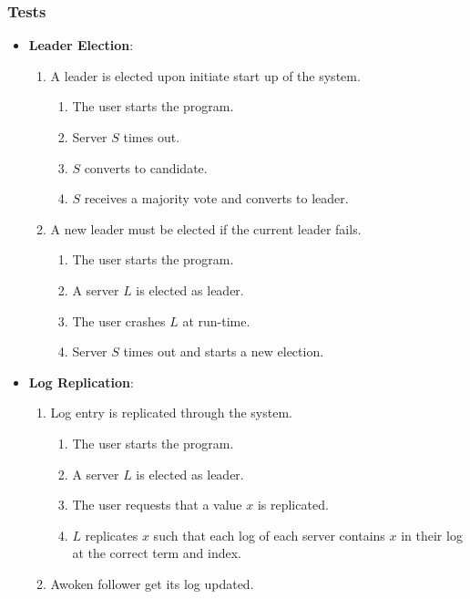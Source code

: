\subsubsection{Tests}

\begin{itemize}
\item \textbf{Leader Election}:
    \begin{enumerate}
    \item A leader is elected upon initiate start up of the system.
        \begin{enumerate}
        \item The user starts the program.
        \item Server $S$ times out.
        \item $S$ converts to candidate.
        \item $S$ receives a majority vote and converts to leader.
        \end{enumerate}
    \item A new leader must be elected if the current leader fails.
        \begin{enumerate}
        \item The user starts the program.
        \item A server $L$ is elected as leader.
        \item The user crashes $L$ at run-time.
        \item Server $S$ times out and starts a new election.
        \end{enumerate}
    \end{enumerate}
\item \textbf{Log Replication}:
    \begin{enumerate}
    \item Log entry is replicated through the system.
        \begin{enumerate}
        \item The user starts the program.
        \item A server $L$ is elected as leader.
        \item The user requests that a value $x$ is replicated.
        \item $L$ replicates $x$ such that each log of each server contains $x$ in their log at the correct term and index.
        \end{enumerate}
    \item Awoken follower get its log updated.
        \begin{enumerate}

\end{enumerate}
\end{enumerate}
\end{itemize}
